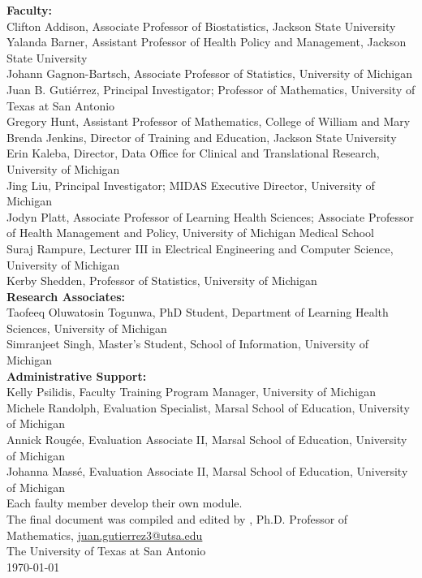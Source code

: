 {\vspace{0.1in}
\noindent
\textbf{Faculty:} \\
Clifton Addison, Associate Professor of Biostatistics, Jackson State University \\
Yalanda Barner, Assistant Professor of Health Policy and Management, Jackson State University \\
Johann Gagnon-Bartsch, Associate Professor of Statistics,  University of Michigan \\
Juan B. Gutiérrez, Principal Investigator; Professor of Mathematics, University of Texas at San Antonio \\
Gregory Hunt, Assistant Professor of Mathematics, College of William and Mary \\
Brenda Jenkins, Director of Training and Education, Jackson State University \\
Erin Kaleba, Director, Data Office for Clinical and Translational Research, University of Michigan \\
Jing Liu, Principal Investigator; MIDAS Executive Director, University of Michigan \\
Jodyn Platt, Associate Professor of Learning Health Sciences; Associate Professor of Health Management and Policy, University of Michigan Medical School \\
Suraj Rampure, Lecturer III in Electrical Engineering and Computer Science, University of Michigan \\
Kerby Shedden, Professor of Statistics, University of Michigan \\
\textbf{Research Associates:} \\
Taofeeq Oluwatosin Togunwa, PhD Student, Department of Learning Health Sciences, University of Michigan \\
Simranjeet Singh, Master's Student, School of Information, University of Michigan \\
\textbf{Administrative Support:} \\
Kelly Psilidis, Faculty Training Program Manager, University of Michigan \\
Michele Randolph, Evaluation Specialist, Marsal School of Education, University of Michigan \\
Annick Rougée, Evaluation Associate II, Marsal School of Education, University of Michigan \\
Johanna Massé, Evaluation Associate II, Marsal School of Education, University of Michigan \\

\vspace{0.1in}
\noindent
Each faulty member develop their own module. \\
The final document was compiled and edited by \href{https://biomathematicus.me/}{\TheAuthor}, Ph.D. Professor of Mathematics, \href{mailto:juan.gutierrez3@utsa.edu}{juan.gutierrez3@utsa.edu} \\
The University of Texas at San Antonio \\
\today
}



